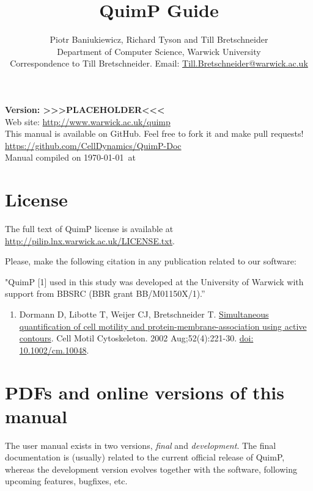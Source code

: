 \documentclass[a4paper,12pt]{article}
\begin{document}
\title{QuimP Guide}
\author{Piotr Baniukiewicz, Richard Tyson and Till Bretschneider\\ \small Department of Computer Science, Warwick University\\ \small Correspondence to Till Bretschneider. Email: \href{mailto:Till.Bretschneider@warwick.ac.uk}{Till.Bretschneider@warwick.ac.uk}\\}
\date{}
\maketitle
\begin{center}
\textbf{{\large Version: >>>PLACEHOLDER<<<}}\\
\vspace{1cm}
Web site: \url{http://www.warwick.ac.uk/quimp}\\
\vspace{2cm}
This manual is available on GitHub. Feel free to fork it and make pull requests!\\
\url{https://github.com/CellDynamics/QuimP-Doc}\\
\vfill
{\footnotesize Manual compiled on \today\  at \currenttime}
\end{center}

\tableofcontents

\setlength{\parskip}{10pt}
\setlength{\parindent}{0pt}

\section{License}
The full text of QuimP license is available at \href{http://pilip.lnx.warwick.ac.uk/LICENSE.txt}{http://pilip.lnx.warwick.ac.uk/LICENSE.txt}.

Please, make the following citation in any publication related to our software:

"QuimP [1] used in this study was developed at the University of Warwick with support from BBSRC (BBR grant BB/M01150X/1).”
\begin{enumerate}
\item Dormann D, Libotte T, Weijer CJ, Bretschneider T. \href{https://www.ncbi.nlm.nih.gov/pubmed/12112136}{Simultaneous quantification of cell motility and protein-membrane-association using active contours}. Cell Motil Cytoskeleton. 2002 Aug;52(4):221-30. \href{http://dx.doi.org/10.1007/978-3-0348-8043-5_17}{doi: 10.1002/cm.10048}.
\end{enumerate}

\section{PDFs and online versions of this manual}
The user manual exists in two versions, \textit{final} and \textit{development}. The final documentation is (usually) related to the current official release of QuimP, whereas the development version evolves together with the software, following upcoming features, bugfixes, etc.
\end{document}
